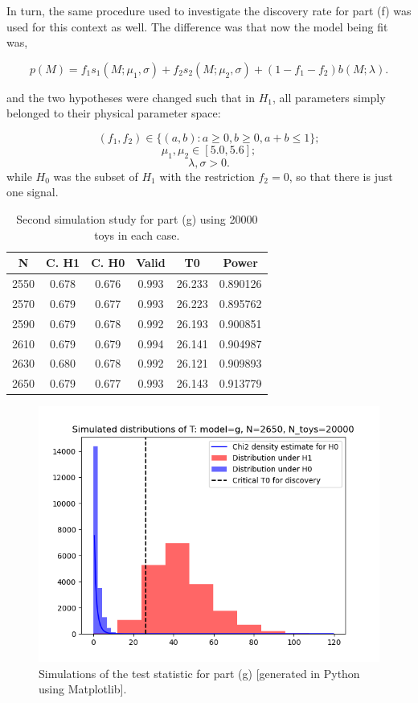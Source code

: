 \documentclass[12pt]{article}
\begin{document}
In turn, the same procedure used to investigate the discovery rate for part (f) was used for this context as well.
The difference was that now the model being fit was,

\[
    p(M) = f_1s_1(M;\mu_1,\sigma) + f_2s_2(M;\mu_2,\sigma) + (1-f_1-f_2)b(M;\lambda).
\]

and the two hypotheses were changed such that in $H_1$, all parameters simply belonged to their physical parameter space:

\[
    (f_1,f_2)\in\{(a,b):a\geq0,b\geq0,a+b\leq1\};
\]
\[
  \mu_1,\mu_2\in[5.0,5.6];
\]
\[
  \lambda, \sigma > 0.
\]
while $H_0$ was the subset of $H_1$ with the restriction $f_2=0$, so that there is just one signal.

\begin{table}[htp]
  \centering
  \begin{tabular}{| c | c | c | c | c | c |}
      \hline
         N & C. H1 & C. H0 & Valid & T0     & Power    \\
      \hline
      2550 & 0.678 & 0.676 & 0.993 & 26.233 & 0.890126 \\
      \hline
      2570 & 0.679 & 0.677 & 0.993 & 26.223 & 0.895762 \\
      \hline
      2590 & 0.679 & 0.678 & 0.992 & 26.193 & 0.900851 \\
      \hline
      2610 & 0.679 & 0.679 & 0.994 & 26.141 & 0.904987 \\
      \hline
      2630 & 0.680 & 0.678 & 0.992 & 26.121 & 0.909893 \\
      \hline
      2650 & 0.679 & 0.677 & 0.993 & 26.143 & 0.913779 \\
      \hline
  \end{tabular}
\caption{Second simulation study for part (g) using 20000 toys in each case.}
\label{tab_g_2}
\end{table}

\begin{figure}[htbp]
  \includegraphics[scale=0.8]{T_distributions_g_2650_20000.png}
  \caption{Simulations of the test statistic for part (g) [generated in Python using Matplotlib].}
  \label{part_g_plot}
\end{figure}
\end{document}
